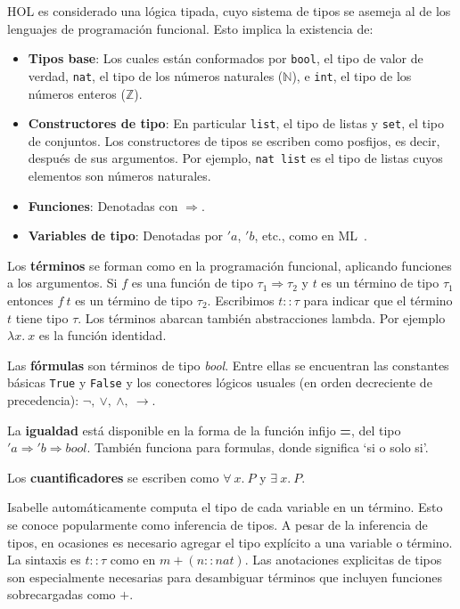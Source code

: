\documentclass[12pt]{book}
\begin{document}
HOL es considerado una lógica tipada, cuyo sistema de tipos se asemeja al de los lenguajes de programación funcional. Esto implica la existencia de:

\begin{itemize}
	\item \textbf{Tipos base}: Los cuales están conformados por \texttt{bool}, el tipo de valor de verdad, \texttt{nat}, el tipo de los números naturales ($\mathbb{N}$), e \texttt{int}, el tipo de los números enteros ($\mathbb{Z}$).
 	\item \textbf{Constructores de tipo}: En particular \texttt{list}, el tipo de listas y \texttt{set}, el tipo de conjuntos. Los constructores de tipos se escriben como posfijos, es decir, después de sus argumentos. Por ejemplo, \texttt{nat list} es el tipo de listas cuyos elementos son números naturales.
  	\item \textbf{Funciones}: Denotadas con $\Rightarrow$.
  	\item \textbf{Variables de tipo}: Denotadas por $'a$, $'b$, etc., como en ML~\cite{ML_programming_language}.
\end{itemize}

Los \textbf{términos} se forman como en la programación funcional, aplicando funciones a los argumentos. Si $f$ es una función de tipo $\tau_1 \Rightarrow \tau_2$ y $t$ es un término de tipo $\tau_1$ entonces $f\ t$ es un término de tipo $\tau_2$. Escribimos $t :: \tau$ para indicar que el término $t$ tiene tipo $\tau$. Los términos abarcan también abstracciones lambda. Por ejemplo $\lambda x.\ x$ es la función identidad.

Las \textbf{fórmulas} son términos de tipo \textit{bool}. Entre ellas se encuentran las constantes básicas \texttt{True} y \texttt{False} y los conectores lógicos usuales (en orden decreciente de precedencia): $\neg,\ \vee,\ \wedge,\ \rightarrow$.

La \textbf{igualdad} está disponible en la forma de la función infijo \textbf{=}, del tipo $'a \Rightarrow 'b \Rightarrow  bool$. También funciona para formulas, donde significa `si o solo si'.

Los \textbf{cuantificadores} se escriben como $\forall\ x.\ P$ y $\exists\ x.\ P$.

Isabelle automáticamente computa el tipo de cada variable en un término. Esto se conoce popularmente como inferencia de tipos. A pesar de la inferencia de tipos, en ocasiones es necesario agregar el tipo explícito a una variable o término. La sintaxis es $t :: \tau$ como en $m + (n::nat)$. Las anotaciones explicitas de tipos son especialmente necesarias para desambiguar términos que incluyen funciones sobrecargadas como $+$.
\end{document}
